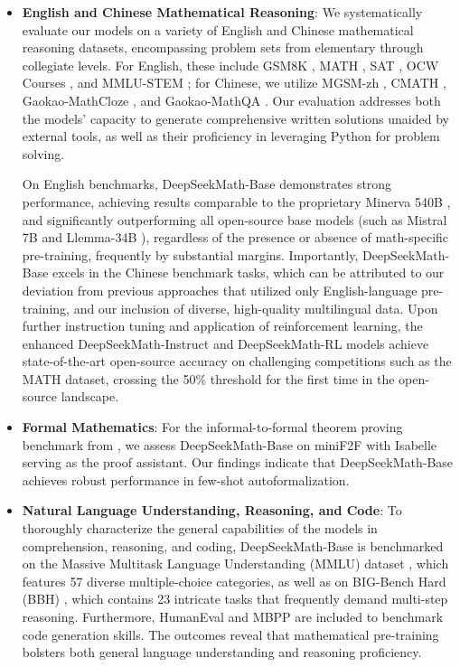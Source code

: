 \begin{itemize}[topsep=0pt]
    \item \textbf{English and Chinese Mathematical Reasoning}: We systematically evaluate our models on a variety of English and Chinese mathematical reasoning datasets, encompassing problem sets from elementary through collegiate levels. For English, these include GSM8K \citep{gsm8k}, MATH \citep{MATH}, SAT \citep{llemma}, OCW Courses \citep{minerva}, and MMLU-STEM \citep{mmlu}; for Chinese, we utilize MGSM-zh \citep{mgsm}, CMATH \citep{wei2023cmath}, Gaokao-MathCloze \citep{agieval}, and Gaokao-MathQA \citep{agieval}. Our evaluation addresses both the models’ capacity to generate comprehensive written solutions unaided by external tools, as well as their proficiency in leveraging Python for problem solving.

    On English benchmarks, DeepSeekMath-Base demonstrates strong performance, achieving results comparable to the proprietary Minerva 540B \citep{minerva}, and significantly outperforming all open-source base models (such as Mistral 7B \citep{mistral} and Llemma-34B \citep{llemma}), regardless of the presence or absence of math-specific pre-training, frequently by substantial margins. Importantly, DeepSeekMath-Base excels in the Chinese benchmark tasks, which can be attributed to our deviation from previous approaches \citep{minerva,llemma} that utilized only English-language pre-training, and our inclusion of diverse, high-quality multilingual data. Upon further instruction tuning and application of reinforcement learning, the enhanced DeepSeekMath-Instruct and DeepSeekMath-RL models achieve state-of-the-art open-source accuracy on challenging competitions such as the MATH dataset, crossing the 50\% threshold for the first time in the open-source landscape.

\item \textbf{Formal Mathematics}: For the informal-to-formal theorem proving benchmark from \citep{dsp_proof}, we assess DeepSeekMath-Base on miniF2F \citep{minif2f} with Isabelle \citep{isabelle} serving as the proof assistant. Our findings indicate that DeepSeekMath-Base achieves robust performance in few-shot autoformalization.

\item \textbf{Natural Language Understanding, Reasoning, and Code}: To thoroughly characterize the general capabilities of the models in comprehension, reasoning, and coding, DeepSeekMath-Base is benchmarked on the Massive Multitask Language Understanding (MMLU) dataset \citep{mmlu}, which features 57 diverse multiple-choice categories, as well as on BIG-Bench Hard (BBH) \citep{bbh}, which contains 23 intricate tasks that frequently demand multi-step reasoning. Furthermore, HumanEval \citep{codex} and MBPP \citep{mbpp} are included to benchmark code generation skills. The outcomes reveal that mathematical pre-training bolsters both general language understanding and reasoning proficiency.


\end{itemize}
